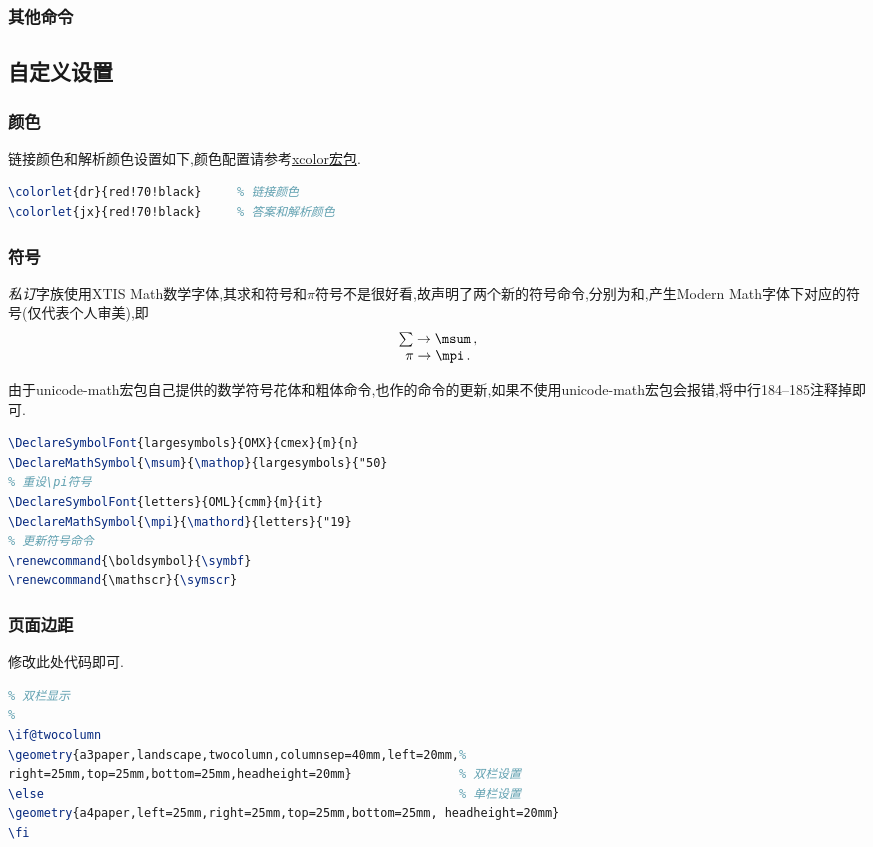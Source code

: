 \documentclass[list,answers,csize4,custom]{sysuexam}
\begin{document}
\subsubsection{其他命令}

\subsection{自定义设置}
\subsubsection{颜色}
链接颜色和解析颜色设置如下,颜色配置请参考\href{https://mirror-hk.koddos.net/CTAN/macros/latex/contrib/xcolor/xcolor.pdf}{xcolor宏包}.
\begin{lstlisting}[title=颜色设置,language=tex,firstnumber=92]
\colorlet{dr}{red!70!black}	    % 链接颜色
\colorlet{jx}{red!70!black}		% 答案和解析颜色
\end{lstlisting}

\subsubsection{符号}
\textit{私订}字族使用XTIS Math数学字体,其求和符号和$\pi$符号不是很好看,故声明了两个新的符号命令,分别为和,产生Modern Math字体下对应的符号(仅代表个人审美),即
$$
\begin{array}{c}
\sum \rightarrow \msum \,,\\
\pi  \rightarrow \mpi  \,.
\end{array}
$$

由于unicode-math宏包自己提供的数学符号花体和粗体命令,也作的命令的更新,如果不使用unicode-math宏包会报错,将中行184--185注释掉即可.

\begin{lstlisting}[title={\mt{sysuexam.cls}文件中\mt{\backslash{}msum}和\mt{\backslash{}mpi}}声明和更新命令,language=tex,firstnumber=177]
% 重设\sum符号
\DeclareSymbolFont{largesymbols}{OMX}{cmex}{m}{n}
\DeclareMathSymbol{\msum}{\mathop}{largesymbols}{"50}
% 重设\pi符号
\DeclareSymbolFont{letters}{OML}{cmm}{m}{it}
\DeclareMathSymbol{\mpi}{\mathord}{letters}{"19}
% 更新符号命令
\renewcommand{\boldsymbol}{\symbf}
\renewcommand{\mathscr}{\symscr}
\end{lstlisting}

\subsubsection{页面边距}
修改此处代码即可.
\begin{lstlisting}[title=页面边距设置,language=tex,firstnumber=261]
%
% 双栏显示
%
\if@twocolumn
\geometry{a3paper,landscape,twocolumn,columnsep=40mm,left=20mm,%
right=25mm,top=25mm,bottom=25mm,headheight=20mm}			   % 双栏设置
\else														   % 单栏设置
\geometry{a4paper,left=25mm,right=25mm,top=25mm,bottom=25mm, headheight=20mm}
\fi
\end{lstlisting}
\end{document}
